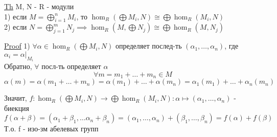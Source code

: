 \documentclass[a4paper]{article}
\begin{document}
\begin{tcolorbox}
\underline{Th} M, N - R - модули\\
1) если $ M = \bigoplus_{i = 1}^{n} M_i $, то $ \hom_R (\bigoplus M_i, N) \cong
\bigoplus \hom_R(M_i, N)$ \\
2) если $ N = \bigoplus_{j = 1}^{m} N_j \implies \hom_R(M, \bigoplus N_j) \cong
\bigoplus \hom_R(M, N_j)$ 

\underline{Proof} 1) $ \forall \alpha \in \hom_R(\bigoplus M_i, N) $ определяет
послед-ть $ (\alpha_1, \dots, \alpha_n) $, где $ \alpha_i = \alpha|_{M_i} $ \\
Обратно, $ \forall $ посл-ть определяет $ \alpha $ 
\[
    \forall m = m_1 + \dots + m_n \in M
\]
\[
    \alpha(m) = \alpha(m_1 + \dots + m_n) = \alpha(m_1) + \dots + \alpha(m_n) = 
    \alpha_1(m_1) + \dots + \alpha_n(m_n)
\]

Значит, $ f: \hom_R(\bigoplus M_i, N) \to \bigoplus\hom_R(M_i, N): \alpha
\mapsto (\alpha_1, \dots , \alpha_n)$ - биекция 
\[
    f(\alpha + \beta) = (\alpha_1 + \beta_1, \dots \alpha_n + \beta_n) = 
    (\alpha_1, \dots, \alpha_n) + (\beta_1, \dots, \beta_n) = f(\alpha) + f(\beta)
\]
Т.о. f - изо-зм абелевых групп
\end{tcolorbox}
\end{document}
